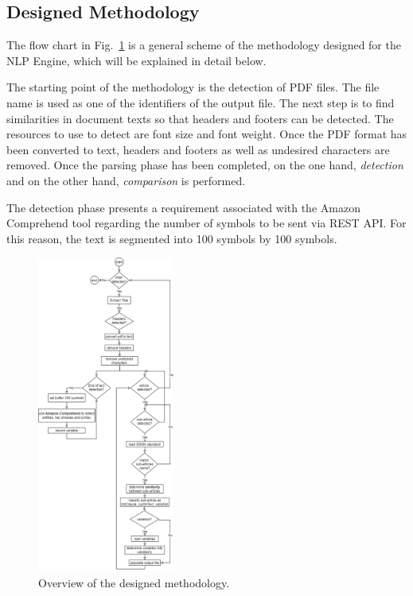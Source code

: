 \documentclass[conference]{style/IEEEtran}
\begin{document}
\subsection{Designed Methodology}
The flow chart in Fig.~\ref{fig1} is a general scheme of the methodology designed for the NLP Engine, which will be explained in detail below.

The starting point of the methodology is the detection of PDF files. The file name is used as one of the identifiers of the output file. The next step is to find similarities in document texts so that headers and footers can be detected. The resources to use to detect are font size and font weight. Once the PDF format has been converted to text, headers and footers as well as undesired characters are removed. Once the parsing phase has been completed, on the one hand, \textit{detection} and on the other hand, \textit{comparison} is performed.

The detection phase presents a requirement associated with the Amazon Comprehend tool regarding the number of symbols to be sent via REST API. For this reason, the text is segmented into 100 symbols by 100 symbols.

\begin{figure}[htbp]
\centerline{\includegraphics[width=0.4\textwidth]{images/methodology.png}}
\caption{Overview of the designed methodology.}
\label{fig1}
\end{figure}
\end{document}
